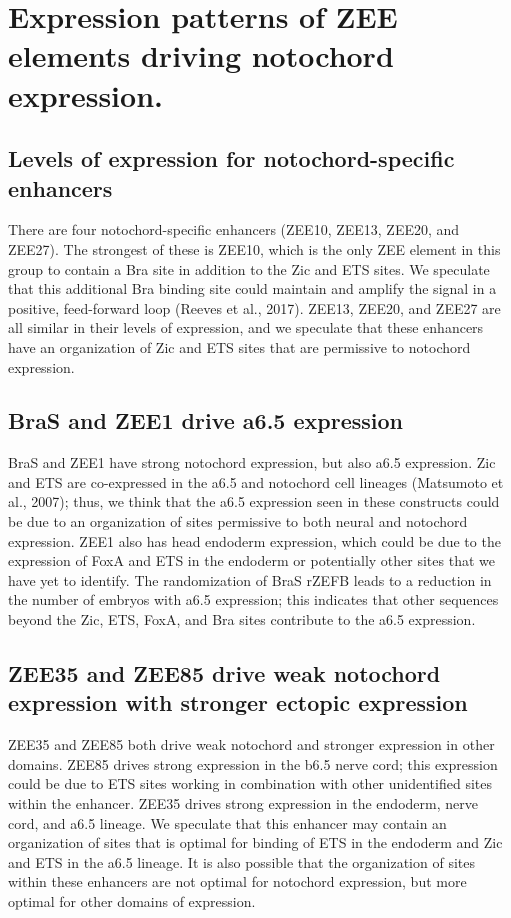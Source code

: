 \section{Expression patterns of ZEE elements driving notochord expression.}

\subsection{Levels of expression for notochord-specific enhancers}
There are four notochord-specific enhancers (ZEE10, ZEE13, ZEE20, and ZEE27). The strongest of these is ZEE10, which is the only ZEE element in this group to contain a Bra site in addition to the Zic and ETS sites. We speculate that this additional Bra binding site could maintain and amplify the signal in a positive, feed-forward loop (Reeves et al., 2017). ZEE13, ZEE20, and ZEE27 are all similar in their levels of expression, and we speculate that these enhancers have an organization of Zic and ETS sites that are permissive to notochord expression. 

\subsection{BraS and ZEE1 drive a6.5 expression}
BraS and ZEE1 have strong notochord expression, but also a6.5 expression. Zic and ETS are co-expressed in the a6.5 and notochord cell lineages (Matsumoto et al., 2007); thus, we think that the a6.5 expression seen in these constructs could be due to an organization of sites permissive to both neural and notochord expression. ZEE1 also has head endoderm expression, which could be due to the expression of FoxA and ETS in the endoderm or potentially other sites that we have yet to identify. The randomization of BraS rZEFB leads to a reduction in the number of embryos with a6.5 expression; this indicates that other sequences beyond the Zic, ETS, FoxA, and Bra sites contribute to the a6.5 expression. 

\subsection{ZEE35 and ZEE85 drive weak notochord expression with stronger ectopic expression}
ZEE35 and ZEE85 both drive weak notochord and stronger expression in other domains. ZEE85 drives strong expression in the b6.5 nerve cord; this expression could be due to ETS sites working in combination with other unidentified sites within the enhancer. ZEE35 drives strong expression in the endoderm, nerve cord, and a6.5 lineage. We speculate that this enhancer may contain an organization of sites that is optimal for binding of ETS in the endoderm and Zic and ETS in the a6.5 lineage. It is also possible that the organization of sites within these enhancers are not optimal for notochord expression, but more optimal for other domains of expression.
